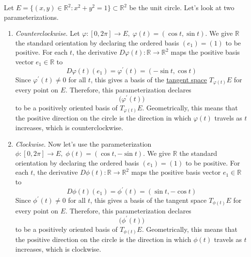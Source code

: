 	\begin{example}
	  \label{ex:orientation-of-curve-in-r2}
		Let $E = \{(x, y) \in \mathbb{R}^2 \colon x^2 + y^2 = 1\} \subset \mathbb{R}^2$ be the unit circle. Let's look at two parameterizations. 
		\begin{enumerate}
			\item \textit{Counterclockwise}. Let $\varphi: [0, 2\pi] \to E, \; \varphi(t) = (\cos t, \sin t)$. We give $\mathbb{R}$ the standard orientation by declaring the ordered basis $(e_1) = (1)$ to be positive. For each $t$, the derivative $D\varphi(t) : \mathbb{R} \to \mathbb{R}^2$ maps the positive basis vector $e_1 \in \mathbb{R}$ to
				\begin{equation}
					D\varphi(t)(e_1) = \varphi^\prime (t) = (-\sin{t}, \cos{t})
				\end{equation}
				Since $\varphi^\prime (t) \neq 0$ for all $t$, this gives a basis of the \hyperref[def:tangent-space]{tangent space} $T_{\varphi(t)} E$ for every point on $E$. Therefore, this parameterization declares
				\begin{equation}
					\big( \varphi^\prime (t) \big)
				\end{equation}
				to be a positively oriented basis of $T_{\varphi(t)}E$. Geometrically, this means that the positive direction on the circle is the direction in which $\varphi(t)$ travels as $t$ increases, which is counterclockwise. 

			\item \textit{Clockwise}. Now let's use the parameterization $\phi: [0, 2\pi] \to E, \; \phi(t) = (\cos t, -\sin t)$. We give $\mathbb{R}$ the standard orientation by declaring the ordered basis $(e_1) = (1)$ to be positive. For each $t$, the derivative $D\phi(t) : \mathbb{R} \to \mathbb{R}^2$ maps the positive basis vector $e_1 \in \mathbb{R}$ to
				\begin{equation}
					D\phi(t)(e_1) = \phi^\prime (t) = (\sin{t}, -\cos{t})
				\end{equation}
				Since $\phi^\prime (t) \neq 0$ for all $t$, this gives a basis of the tangent space $T_{\phi(t)} E$ for every point on $E$. Therefore, this parameterization declares
				\begin{equation}
					\big( \phi^\prime (t) \big)
				\end{equation}
				to be a positively oriented basis of $T_{\phi(t)}E$. Geometrically, this means that the positive direction on the circle is the direction in which $\phi(t)$ travels as $t$ increases, which is clockwise.
		\end{enumerate}
	\end{example}

